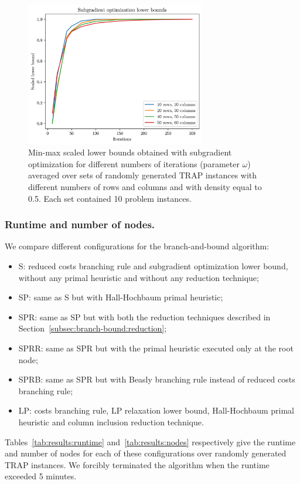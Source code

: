\documentclass[runningheads]{llncs}
\begin{document}
\begin{figure}
  \center
  \includegraphics[width=0.7\textwidth]{img/subgrad_lb.png}
  \caption{Min-max scaled lower bounds obtained with subgradient optimization for different numbers of iterations (parameter $\omega$) averaged over sets of randomly generated TRAP instances with different numbers of rows and columns and with density equal to 0.5. Each set contained 10 problem instances.} 
  \label{fig:results:subgrad}
\end{figure}

\subsubsection{Runtime and number of nodes.} We compare different configurations for the branch-and-bound algorithm:
\begin{itemize}
  \item S: reduced costs branching rule and subgradient optimization lower bound, without any primal heuristic and without any reduction technique;
  \item SP: same as S but with Hall-Hochbaum primal heuristic;
  \item SPR: same as SP but with both the reduction techniques described in Section~\ref{subsec:branch-bound:reduction};
  \item SPRR: same as SPR but with the primal heuristic executed only at the root node;
  \item SPRB: same as SPR but with Beasly branching rule instead of reduced costs branching rule;
  \item LP: costs branching rule, LP relaxation lower bound, Hall-Hochbaum primal heuristic and column inclusion reduction technique.
\end{itemize}

Tables~\ref{tab:results:runtime} and~\ref{tab:results:nodes} respectively give the runtime and number of nodes for each of these configurations over randomly generated TRAP instances. We forcibly terminated the algorithm when the runtime exceeded 5 minutes. 
\end{document}
